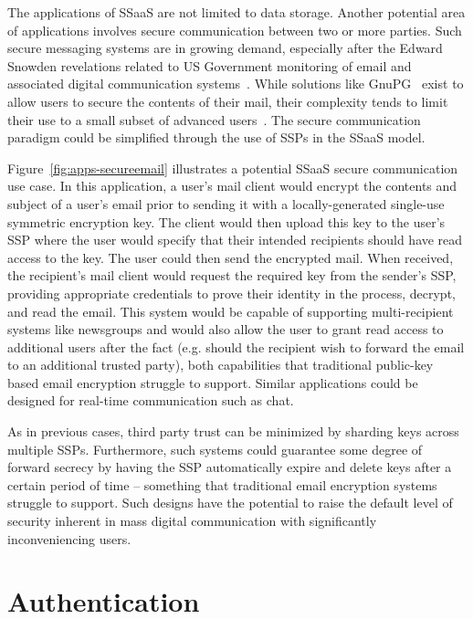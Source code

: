 The applications of SSaaS are not limited to data storage. Another
potential area of applications involves secure communication between
two or more parties. Such secure messaging systems are in growing
demand, especially after the Edward Snowden revelations related to US
Government monitoring of email and associated digital communication
systems~\cite{gellman-muscular, greenwald-collect,
  greenwald-prism}. While solutions like GnuPG~\cite{gnupg} exist to
allow users to secure the contents of their mail, their complexity
tends to limit their use to a small subset of advanced
users~\cite{green-challenge, whitten1999}. The secure communication
paradigm could be simplified through the use of SSPs in the SSaaS
model.

Figure~\ref{fig:apps-secureemail} illustrates a potential SSaaS secure
communication use case. In this application, a user's mail client
would encrypt the contents and subject of a user's email prior to
sending it with a locally-generated single-use symmetric encryption
key. The client would then upload this key to the user's SSP where the
user would specify that their intended recipients should have read
access to the key. The user could then send the encrypted mail. When
received, the recipient's mail client would request the required key
from the sender's SSP, providing appropriate credentials to prove
their identity in the process, decrypt, and read the email. This
system would be capable of supporting multi-recipient systems like
newsgroups and would also allow the user to grant read access to
additional users after the fact (e.g. should the recipient wish to
forward the email to an additional trusted party), both capabilities
that traditional public-key based email encryption struggle to
support. Similar applications could be designed for real-time
communication such as chat.

As in previous cases, third party trust can be minimized by sharding
keys across multiple SSPs. Furthermore, such systems could guarantee
some degree of forward secrecy by having the SSP automatically expire
and delete keys after a certain period of time -- something that
traditional email encryption systems struggle to support. Such designs
have the potential to raise the default level of security inherent in
mass digital communication with significantly inconveniencing users.

\section{Authentication}

